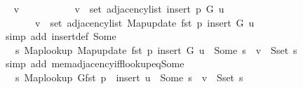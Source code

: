 \begin{isabellebody}
\ \isamarkupfalse%
\ v\isanewline
\ \ \ \ \isamarkupfalse%
\isanewline
\ \ \ \ \ \ {\isachardoublequoteopen}v\ {\isasymin}\ set\ {\isacharparenleft}{\kern0pt}adjacency{\isacharunderscore}{\kern0pt}list\ {\isacharparenleft}{\kern0pt}insert\ p\ G{\isacharparenright}{\kern0pt}\ u{\isacharparenright}{\kern0pt}\ {\isasymlongleftrightarrow}\isanewline
\ \ \ \ \ \ \ v\ {\isasymin}\ set\ {\isacharparenleft}{\kern0pt}adjacency{\isacharunderscore}{\kern0pt}list\ {\isacharparenleft}{\kern0pt}Map{\isacharunderscore}{\kern0pt}update\ {\isacharparenleft}{\kern0pt}fst\ p{\isacharparenright}{\kern0pt}\ {\isacharquery}{\kern0pt}insert\ G{\isacharparenright}{\kern0pt}\ u{\isacharparenright}{\kern0pt}{\isachardoublequoteclose}\isanewline
\ \ \ \ \ \ \isamarkupfalse%
\ {\isacharparenleft}{\kern0pt}simp\ add{\isacharcolon}{\kern0pt}\ insert{\isacharunderscore}{\kern0pt}def\ Some{\isacharparenright}{\kern0pt}\isanewline
\ \ \ \ \isamarkupfalse%
\ \isamarkupfalse%
\ {\isachardoublequoteopen}{\isachardot}{\kern0pt}{\isachardot}{\kern0pt}{\isachardot}{\kern0pt}\ {\isasymlongleftrightarrow}\ {\isacharparenleft}{\kern0pt}{\isasymexists}s{\isachardot}{\kern0pt}\ Map{\isacharunderscore}{\kern0pt}lookup\ {\isacharparenleft}{\kern0pt}Map{\isacharunderscore}{\kern0pt}update\ {\isacharparenleft}{\kern0pt}fst\ p{\isacharparenright}{\kern0pt}\ {\isacharquery}{\kern0pt}insert\ G{\isacharparenright}{\kern0pt}\ u\ {\isacharequal}{\kern0pt}\ Some\ s\ {\isasymand}\ v\ {\isasymin}\ S{\isachardot}{\kern0pt}set\ s{\isacharparenright}{\kern0pt}{\isachardoublequoteclose}\isanewline
\ \ \ \ \ \ \isamarkupfalse%
\ {\isacharparenleft}{\kern0pt}simp\ add{\isacharcolon}{\kern0pt}\ mem{\isacharunderscore}{\kern0pt}adjacency{\isacharunderscore}{\kern0pt}iff{\isacharunderscore}{\kern0pt}lookup{\isacharunderscore}{\kern0pt}eq{\isacharunderscore}{\kern0pt}Some{\isacharparenright}{\kern0pt}\isanewline
\ \ \ \ \isamarkupfalse%
\ \isamarkupfalse%
\ {\isachardoublequoteopen}{\isachardot}{\kern0pt}{\isachardot}{\kern0pt}{\isachardot}{\kern0pt}\ {\isasymlongleftrightarrow}\ {\isacharparenleft}{\kern0pt}{\isasymexists}s{\isachardot}{\kern0pt}\ {\isacharparenleft}{\kern0pt}Map{\isacharunderscore}{\kern0pt}lookup\ G{\isacharparenleft}{\kern0pt}fst\ p\ {\isasymmapsto}\ {\isacharquery}{\kern0pt}insert{\isacharparenright}{\kern0pt}{\isacharparenright}{\kern0pt}\ u\ {\isacharequal}{\kern0pt}\ Some\ s\ {\isasymand}\ v\ {\isasymin}\ S{\isachardot}{\kern0pt}set\ s{\isacharparenright}{\kern0pt}{\isachardoublequoteclose}\isanewline

\end{isabellebody}
